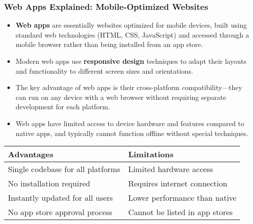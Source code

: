 \documentclass{beamer}
\begin{document}
	\begin{frame}
		\frametitle{Web Apps Explained: Mobile-Optimized Websites}
		
		\begin{itemize}
			\item \textbf{Web apps} are essentially websites optimized for mobile devices, built using standard web technologies (HTML, CSS, JavaScript) and accessed through a mobile browser rather than being installed from an app store.
			\item Modern web apps use \textbf{responsive design} techniques to adapt their layouts and functionality to different screen sizes and orientations.
			\item The key advantage of web apps is their cross-platform compatibility—they can run on any device with a web browser without requiring separate development for each platform.
			\item Web apps have limited access to device hardware and features compared to native apps, and typically cannot function offline without special techniques.
		\end{itemize}
		
		\begin{center}
			\scriptsize{
				\begin{tabular}{|p{4cm}|p{4cm}|}
					\hline
					\textbf{Advantages} & \textbf{Limitations} \\
					\hline
					Single codebase for all platforms & Limited hardware access \\
					No installation required & Requires internet connection \\
					Instantly updated for all users & Lower performance than native \\
					No app store approval process & Cannot be listed in app stores \\
					\hline
				\end{tabular}
			}
		\end{center}
		
	\end{frame}
	
\end{document}
